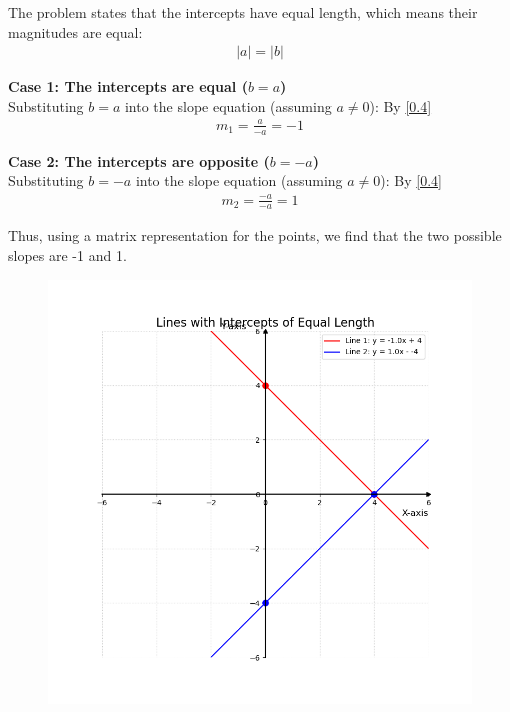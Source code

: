 \documentclass[journal]{IEEEtran}
\begin{document}
	The problem states that the intercepts have equal length, which means their magnitudes are equal:
	\begin{align}
		|a| = |b|
	\end{align}
	
	\textbf{Case 1: The intercepts are equal ($b = a$)}\\
	Substituting $b=a$ into the slope equation (assuming $a \neq 0$):
	By \eqref{0.4}
	\begin{align}
		m_1 = \frac{a}{-a} = -1
	\end{align}
	
	\textbf{Case 2: The intercepts are opposite ($b = -a$)}\\
	Substituting $b=-a$ into the slope equation (assuming $a \neq 0$):
	By \eqref{0.4}
	\begin{align}
		m_2 = \frac{-a}{-a} = 1
	\end{align}
	
	Thus, using a matrix representation for the points, we find that the two possible slopes are -1 and 1.
	
	\begin{figure}[H]
		\centering
		\includegraphics[width = 0.8\columnwidth]{Figure_1.png}
		\caption*{}
		\label{fig1}
	\end{figure}
	
\end{document}
